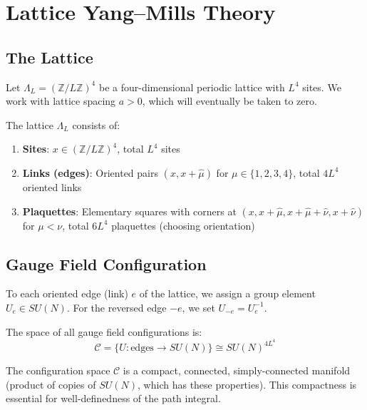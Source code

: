 \section{Lattice Yang--Mills Theory}
\label{sec:lattice}

\subsection{The Lattice}

Let $\Lambda_L = (\mathbb{Z}/L\mathbb{Z})^4$ be a four-dimensional periodic 
lattice with $L^4$ sites. We work with lattice spacing $a > 0$, which will 
eventually be taken to zero.

\begin{definition}
The lattice $\Lambda_L$ consists of:
\begin{enumerate}[label=(\roman*)]
\item \textbf{Sites}: $x \in (\mathbb{Z}/L\mathbb{Z})^4$, total $L^4$ sites
\item \textbf{Links (edges)}: Oriented pairs $(x, x+\hat{\mu})$ for $\mu \in \{1,2,3,4\}$, 
total $4L^4$ oriented links
\item \textbf{Plaquettes}: Elementary squares with corners at 
$(x, x+\hat{\mu}, x+\hat{\mu}+\hat{\nu}, x+\hat{\nu})$ for $\mu < \nu$, 
total $6L^4$ plaquettes (choosing orientation)
\end{enumerate}
\end{definition}

\subsection{Gauge Field Configuration}

To each oriented edge (link) $e$ of the lattice, we assign a group element 
$U_e \in SU(N)$. For the reversed edge $-e$, we set $U_{-e} = U_e^{-1}$.

The space of all gauge field configurations is:
\[
\mathcal{C} = \{U : \text{edges} \to SU(N)\} \cong SU(N)^{4L^4}
\]

\begin{remark}
The configuration space $\mathcal{C}$ is a compact, connected, simply-connected 
manifold (product of copies of $SU(N)$, which has these properties). This 
compactness is essential for well-definedness of the path integral.
\end{remark}

